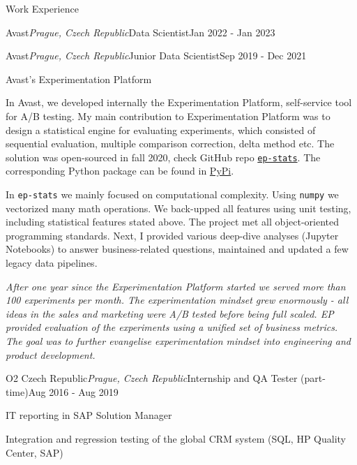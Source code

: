 \documentclass{resume} %
\begin{document}
\begin{rSection}{Work Experience}
\begin{rSubsection}{Avast}{\em Prague, Czech Republic}{Data Scientist}{Jan 2022 - Jan 2023}
    \end{rSubsection}

    \begin{rSubsection}{Avast}{\em Prague, Czech Republic}{Junior Data Scientist}{Sep 2019 - Dec 2021}
        \item Avast's Experimentation Platform
        
        In Avast, we developed internally the Experimentation Platform, self-service tool for A/B testing. My main contribution to Experimentation Platform was to design a statistical engine for evaluating experiments, which consisted of sequential evaluation, multiple comparison correction, delta method etc.
        The solution was open-sourced in fall 2020, check GitHub repo \href{https://github.com/avast/ep-stats}{\texttt{ep-stats}}. The corresponding Python package can be found in \href{https://pypi.org/project/ep-stats/}{PyPi}.
        
        In \texttt{ep-stats} we mainly focused on computational complexity. Using \texttt{numpy} we vectorized many math operations. We back-upped all features using unit testing, including statistical features stated above. The project met all object-oriented programming standards.
        Next, I provided various deep-dive analyses (Jupyter Notebooks) to answer business-related questions, maintained and updated a few legacy data pipelines.

        \textit{After one year since the Experimentation Platform started we served more than 100 experiments per month. The experimentation mindset grew enormously - all ideas in the sales and marketing were A/B tested before being full scaled. EP provided evaluation of the experiments using a unified set of business metrics. The goal was to further evangelise experimentation mindset into engineering and product development.}
        
    \end{rSubsection}
        
    \begin{rSubsection}{O2 Czech Republic}{\em Prague, Czech Republic}{Internship and QA Tester (part-time)}{Aug 2016 - Aug 2019}
        \item IT reporting in SAP Solution Manager
        \item Integration and regression testing of the global CRM system (SQL, HP Quality Center, SAP)
    \end{rSubsection}
        
\end{rSection}
    
\end{document}
